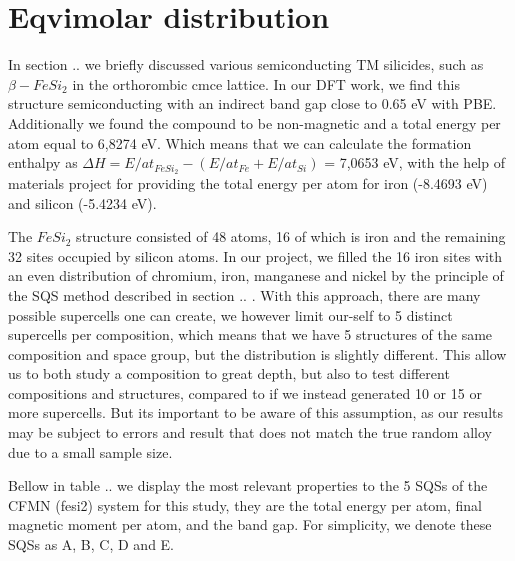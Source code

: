 \section{Eqvimolar distribution}
In section .. we briefly discussed various semiconducting TM silicides, such as $\beta-FeSi_2$ in the orthorombic cmce lattice. In our DFT work, we find this structure semiconducting with an indirect band gap close to 0.65 eV with PBE. Additionally we found the compound to be non-magnetic and a total energy per atom equal to 6,8274 eV. Which means that we can calculate the formation enthalpy as $\Delta H = E/at_{FeSi_2} - (E/at_{Fe} + E/at_{Si})$ = 7,0653 eV, with the help of materials project for providing the total energy per atom for iron (-8.4693 eV) and silicon (-5.4234 eV).

The $FeSi_2$ structure consisted of 48 atoms, 16 of which is iron and the remaining 32 sites occupied by silicon atoms. In our project, we filled the 16 iron sites with an even distribution of chromium, iron, manganese and nickel by the principle of the SQS method described in section .. . With this approach, there are many possible supercells one can create, we however limit our-self to 5 distinct supercells per composition, which means that we have 5 structures of the same composition and space group, but the distribution is slightly different. This allow us to both study a composition to great depth, but also to test different compositions and structures, compared to if we instead generated 10 or 15 or more supercells. But its important to be aware of this assumption, as our results may be subject to errors and result that does not match the true random alloy due to a small sample size.

Bellow in table .. we display the most relevant properties to the 5 SQSs of the CFMN (fesi2) system for this study, they are the total energy per atom, final magnetic moment per atom, and the band gap. For simplicity, we denote these SQSs as A, B, C, D and E.   


